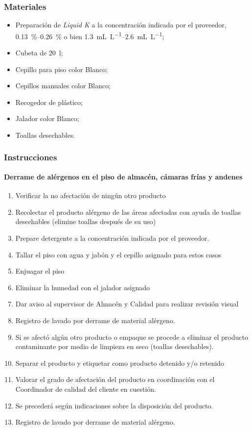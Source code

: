 \subsubsection{Materiales}
\begin{itemize}
	\item Preparación de \emph{Liquid K} a la concentración indicada por el proveedor, \qtyrange{0.13}{0.26}{\percent} o bien \qtyrange{1.3}{2.6}{\milli\liter\per\liter};
	\item Cubeta de \qty{20}{\litre};
	\item Cepillo para piso color Blanco;
	\item Cepillos manuales color Blanco;
	\item Recogedor de plástico;
	\item Jalador color Blanco;
	\item Toallas desechables.
\end{itemize}

\subsubsection{Instrucciones}
\paragraph{Derrame de alérgenos en el piso de almacén, cámaras frías y andenes}

\begin{enumerate}
	\item Verificar la no afectación de ningún otro producto
	\item Recolectar el producto alérgeno de las áreas afectadas con ayuda de toallas desechables (elimine toallas después de su uso)
	\item Prepare detergente a la concentración indicada por el proveedor.
	\item Tallar el piso con agua y jabón y el cepillo asignado para estos casos
	\item Enjuagar el piso
	\item Eliminar la humedad con el jalador asignado
	\item Dar aviso al supervisor de Almacén y Calidad para realizar revisión visual
	\item Registro de lavado por derrame de material alérgeno.
	\item Si se afectó algún otro producto o empaque se procede a eliminar el producto contaminante por medio de limpieza en seco (toallas desechables).
	\item Separar el producto y etiquetar como producto detenido y/o retenido
	\item Valorar el grado de afectación del producto en coordinación con el Coordinador de calidad del cliente en cuestión.
	\item Se precederá según indicaciones sobre la disposición del producto.
	\item Registro de lavado por derrame de material alérgeno.
\end{enumerate}

